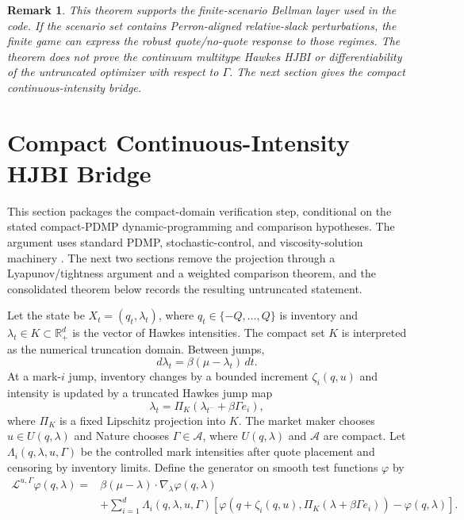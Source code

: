 \documentclass[11pt]{article}
\newtheorem{remark}[assumption]{Remark}
\newcommand{\R}{\mathbb{R}}
\begin{document}
\begin{remark}
This theorem supports the finite-scenario Bellman layer used in the code. If
the scenario set contains Perron-aligned relative-slack perturbations, the
finite game can express the robust quote/no-quote response to those regimes.
The theorem does not prove the continuum multitype Hawkes HJBI or
differentiability of the untruncated optimizer with respect to $\Gamma$. The next
section gives the compact continuous-intensity bridge.
\end{remark}

\section{Compact Continuous-Intensity HJBI Bridge}

This section packages the compact-domain verification step, conditional on the
stated compact-PDMP dynamic-programming and comparison hypotheses. The argument
uses standard PDMP, stochastic-control, and viscosity-solution machinery
\cite{Davis1993,FlemingSoner2006,CrandallIshiiLions1992}. The next two sections
remove the projection through a Lyapunov/tightness argument and a weighted
comparison theorem, and the consolidated theorem below records the
resulting untruncated statement.

Let the state be $X_t=(q_t,\lambda_t)$, where
$q_t\in\{-Q,\ldots,Q\}$ is inventory and
$\lambda_t\in K\subset\R_+^d$ is the vector of Hawkes intensities. The compact
set $K$ is interpreted as the numerical truncation domain. Between jumps,
\[
d\lambda_t=\beta(\mu-\lambda_t)\,dt.
\]
At a mark-$i$ jump, inventory changes by a bounded increment $\zeta_i(q,u)$
and intensity is updated by a truncated Hawkes jump map
\[
\lambda_{t}=\Pi_K\left(\lambda_{t^-}+\beta\Gamma e_i\right),
\]
where $\Pi_K$ is a fixed Lipschitz projection into $K$. The market maker chooses
$u\in U(q,\lambda)$ and Nature chooses
$\Gamma\in\mathcal A$, where $U(q,\lambda)$ and $\mathcal A$ are compact. Let
$\Lambda_i(q,\lambda,u,\Gamma)$ be the controlled mark intensities after quote
placement and censoring by inventory limits. Define the generator on smooth
test functions $\varphi$ by
\[
\begin{aligned}
\mathcal L^{u,\Gamma}\varphi(q,\lambda)
={}&\beta(\mu-\lambda)\cdot\nabla_\lambda\varphi(q,\lambda)\\
&+\sum_{i=1}^d \Lambda_i(q,\lambda,u,\Gamma)
\left[
\varphi(q+\zeta_i(q,u),\Pi_K(\lambda+\beta\Gamma e_i))
-\varphi(q,\lambda)
\right].
\end{aligned}
\]
\end{document}
